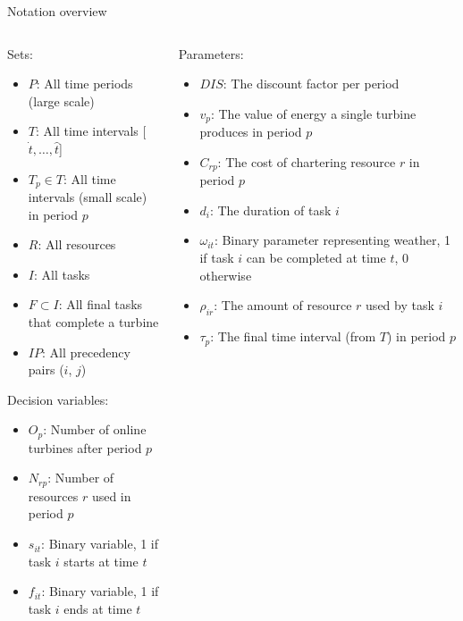\documentclass{beamer}
\begin{document}
\begin{frame}{Notation overview}
\scriptsize

\begin{columns}
\begin{column}{.48\textwidth}
Sets:
\begin{itemize}
\item $P$: All time periods (large scale)
\item $T$: All time intervals [$\dot{t}, \dots , \hat{t}$]
\item $T_p \in T$: All time intervals (small scale) in period $p$
\item $R$: All resources
\item $I$: All tasks
\item $F \subset I$: All final tasks that complete a turbine
\item $IP$: All precedency pairs ($i$, $j$)
\end{itemize}

Decision variables:
\begin{itemize}
\item $O_{p}$: Number of online turbines after period $p$
\item $N_{rp}$: Number of resources $r$ used in period $p$
\item $s_{it}$: Binary variable, 1 if task $i$ starts at time $t$
\item $f_{it}$: Binary variable, 1 if task $i$ ends at time $t$
\end{itemize}
\end{column}

\hfill

\begin{column}{.48\textwidth}
Parameters:
\begin{itemize}
\item $DIS$: The discount factor per period
\item $v_p$: The value of energy a single turbine produces in period $p$
\item $C_{rp}$: The cost of chartering resource $r$ in period $p$
\item $d_i$: The duration of task $i$
\item $\omega_{it}$: Binary parameter representing weather, 1 if task $i$ can be completed at time $t$, 0 otherwise
\item $\rho_{ir}$: The amount of resource $r$ used by task $i$
\item $\tau_p$: The final time interval (from $T$) in period $p$
\end{itemize}
\end{column}
\end{columns}

\end{frame}
\end{document}
